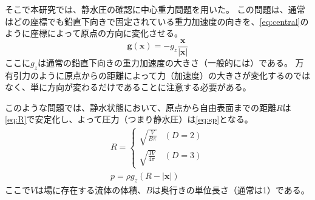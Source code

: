 		そこで本研究では、静水圧の確認に中心重力問題を用いた。
		この問題は、通常はどの座標でも鉛直下向きで固定されている重力加速度の向きを、\cref{eq:central}のように座標によって原点の方向に変化させる。
		\begin{equation}
			\mathbf{g} \left( \mathbf{x} \right) = -g_z \frac{\mathbf{x}}{\left| \mathbf{x} \right|} \label{eq:central}
		\end{equation}
		ここに$g_z$は通常の鉛直下向きの重力加速度の大きさ（一般的には）である。
		万有引力のように原点からの距離によって力（加速度）の大きさが変化するのではなく、単に方向が変わるだけであることに注意する必要がある。

		このような問題では、静水状態において、原点から自由表面までの距離$R$は\cref{eq:R}で安定化し、よって圧力（つまり静水圧）は\cref{eq:sp}となる。
		\begin{gather}
			R = \begin{cases}
				\displaystyle \sqrt{\frac{V}{B \pi}} & \left( D=2 \right) \\
				\displaystyle \sqrt{\frac{3V}{4 \pi}} & \left( D=3 \right)
			\end{cases} \label{eq:R} \\
			p = \rho g_z \left( R - \left| \mathbf{x} \right| \right) \label{eq:sp}
		\end{gather}
		ここで$V$は場に存在する流体の体積、$B$は奥行きの単位長さ（通常は1）である。

